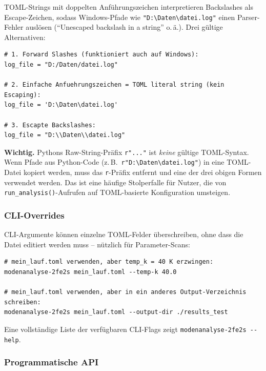 \documentclass[11pt,a4paper,twoside]{article}
\theoremstyle{remark}
\begin{document}
TOML-Strings mit doppelten Anf\"uhrungszeichen interpretieren
Backslashes als Escape-Zeichen, sodass Windows-Pfade wie
\texttt{"D:\textbackslash{}Daten\textbackslash{}datei.log"} einen
Parser-Fehler ausl\"osen (``Unescaped backslash in a string'' o.\,\"a.).
Drei g\"ultige Alternativen:

\begin{lstlisting}[style=bash]
# 1. Forward Slashes (funktioniert auch auf Windows):
log_file = "D:/Daten/datei.log"

# 2. Einfache Anfuehrungszeichen = TOML literal string (kein Escaping):
log_file = 'D:\Daten\datei.log'

# 3. Escapte Backslashes:
log_file = "D:\\Daten\\datei.log"
\end{lstlisting}

\begin{warnbox}
\textbf{Wichtig.} Pythons Raw-String-Pr\"afix \texttt{r"..."} ist
\emph{keine} g\"ultige TOML-Syntax. Wenn Pfade aus Python-Code
(z.\,B.\ \texttt{r"D:\textbackslash{}Daten\textbackslash{}datei.log"})
in eine TOML-Datei kopiert werden, muss das \texttt{r}-Pr\"afix
entfernt und eine der drei obigen Formen verwendet werden. Das ist
eine h\"aufige Stolperfalle f\"ur Nutzer, die von
\texttt{run\_analysis()}-Aufrufen auf TOML-basierte Konfiguration
umsteigen.
\end{warnbox}

\subsubsection*{CLI-Overrides}

CLI-Argumente k\"onnen einzelne TOML-Felder \"uberschreiben, ohne
dass die Datei editiert werden muss -- n\"utzlich f\"ur
Parameter-Scans:

\begin{lstlisting}[style=bash]
# mein_lauf.toml verwenden, aber temp_k = 40 K erzwingen:
modenanalyse-2fe2s mein_lauf.toml --temp-k 40.0

# mein_lauf.toml verwenden, aber in ein anderes Output-Verzeichnis schreiben:
modenanalyse-2fe2s mein_lauf.toml --output-dir ./results_test
\end{lstlisting}

Eine vollst\"andige Liste der verf\"ugbaren CLI-Flags zeigt
\texttt{modenanalyse-2fe2s -{}-help}.

\subsubsection*{Programmatische API}
\end{document}
